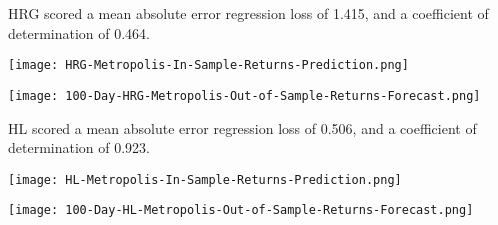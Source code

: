 HRG scored a mean absolute error regression loss of 1.415, and a coefficient of determination of 0.464.

\texttt{[image: HRG-Metropolis-In-Sample-Returns-Prediction.png]}

\texttt{[image: 100-Day-HRG-Metropolis-Out-of-Sample-Returns-Forecast.png]}

HL scored a mean absolute error regression loss of 0.506, and a coefficient of determination of 0.923.

\texttt{[image: HL-Metropolis-In-Sample-Returns-Prediction.png]}

\texttt{[image: 100-Day-HL-Metropolis-Out-of-Sample-Returns-Forecast.png]}